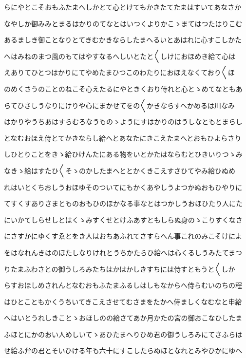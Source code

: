 \documentclass[a4paper,11pt,landscape]{ltjtarticle}
\begin{document}
らにやとこそおもふたまへしかとて心とけてもかきたてたまはすいてあなさか
\par\medskip
なやしか御みみとまるはかりのてなとはいつくよりかこゝまてはつたはりこむ
\par\medskip
あるましき御ことなりとてきむかきならしたまへるいとあはれに心すこしかた
\par\medskip
へはみねのまつ風のもてはやすなるへしいとたと〱しけにおほめき給て心は
\par\medskip
えありてひとつはかりにてやめたまひつこのわたりにおほえなくており〱ほ
\par\medskip
のめくさうのことのねこそ心えたるにやときくおり侍れと心とゝめてなともあ
\par\medskip
らてひさしうなりにけりや心にまかせてをの〱かきならすへかめるは川なみ
\par\medskip
はかりやうちあはすらむろなうものゝようにすはかりのはうしなともとまらし
\par\medskip
となむおほえ侍とてかきならし給へとあなたにきこえたまへとおもひよらさり
\par\medskip
しひとりことをきゝ給ひけんたにある物をいとかたはならむとひきいりつゝみ
\par\medskip
なきゝ給はすたひ〱そゝのかしたまへととかくきこえすさひてやみ給ひぬめ
\par\medskip
れはいとくちおしうおほゆそのついてにもかくあやしうよつかぬおもひやりに
\par\medskip
てすくすありさまとものおもひのほかなる事なとはつかしうおほひたり人にた
\par\medskip
にいかてしらせしとはくゝみすくせとけふあすともしらぬ身のゝこりすくなさ
\par\medskip
にさすかにゆくすゑとをき人はおちあふれてさすらへん事これのみこそけによ
\par\medskip
をはなれんきはのほたしなりけれとうちかたらひ給へは心くるしうみたてまつ
\par\medskip
りたまふわさとの御うしろみたちはかはかしきすちには侍すともうと〱しか
\par\medskip
らすおほしめされんとなむおもふたまふるしはしもなからへ侍らむいのちの程
\par\medskip
はひとこともかくうちいてきこえさせてむさまをたかへ侍ましくなむなと申給
\par\medskip
へはいとうれしきことゝおほしのの給さてあか月かたの宮の御おこなひしたま
\par\medskip
ふほとにかのおい人めしいてゝあひたまへりひめ君の御うしろみにてさふらは
\par\medskip
せ給ふ弁の君とそいひける年も六十にすこしたらぬほとなれとみやひかにゆへ
\end{document}
